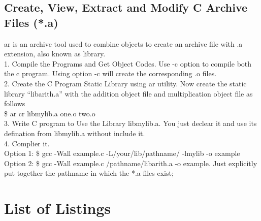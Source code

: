 \documentclass[a4paper, 12pt]{article}
\begin{document}
    \subsection{Create, View, Extract and Modify C Archive Files (*.a)}
    \textsf{ar} is an archive tool used to combine objects to create an archive file with .a extension, also known as library.\\
    1. Compile the Programs and Get Object Codes. Use -c option to compile both the c program. Using option -c will create the corresponding .o files.\\
    2. Create the C Program Static Library using ar utility. Now create the static library “libarith.a” with the addition object file and multiplication object file as follows\\
    \textsf{\$ ar cr libmylib.a one.o two.o}\\
    3. Write C program to Use the Library libmylib.a. You just declear it and use its defination from \textsf{libmylib.a} without include it.\\
    4. Complier it.\\
    Option 1: \$ gcc -Wall example.c -L/your/lib/pathname/ -lmylib -o example\\
    Option 2: \$ gcc -Wall example.c /pathname/libarith.a -o example. Just explicitly put together the pathname in which the *.a files exist;



    \section*{List of Listings}
\end{document}
